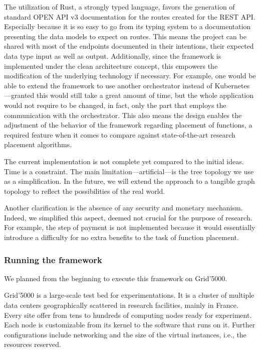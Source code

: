 \documentclass[11pt]{sdm}
\begin{document}
The utilization of Rust, a strongly typed language, favors the generation of standard OPEN API v3 documentation for the routes created for the \gls{REST} \gls{API}. Especially because it is so easy to go from its typing system to a documentation presenting the data models to expect on routes. This means the project can be shared with most of the endpoints documented in their intentions, their expected data type input as well as output. Additionally, since the framework is implemented under the clean architecture concept, this empowers the modification of the underlying technology if necessary. For example, one would be able to extend the framework to use another orchestrator instead of Kubernetes—granted this would still take a great amount of time, but the whole application would not require to be changed, in fact, only the part that employs the communication with the orchestrator. This also means the design enables the adjustment of the behavior of the framework regarding placement of functions, a required feature when it comes to compare against state-of-the-art research placement algorithms. 

The current implementation is not complete yet compared to the initial ideas. Time is a constraint. The main limitation—artificial—is the tree topology we use as a simplification. In the future, we will extend the approach to a tangible graph topology to reflect the possibilities of the real world.

Another clarification is the absence of any security and monetary mechanism. Indeed, we simplified this aspect, deemed not crucial for the purpose of research. For example, the step of payment is not implemented because it would essentially introduce a difficulty for no extra benefits to the task of function placement.

\subsubsection{Running the framework}

We planned from the beginning to execute this framework on Grid'5000.

Grid'5000 is a large-scale test bed for experimentations. It is a cluster of multiple data centers geographically scattered in research facilities, mainly in France. Every site offer from tens to hundreds of computing nodes ready for experiment. Each node is customizable from its kernel to the software that runs on it. Further configurations include networking and the size of the virtual instances, i.e., the resources reserved.
\end{document}
